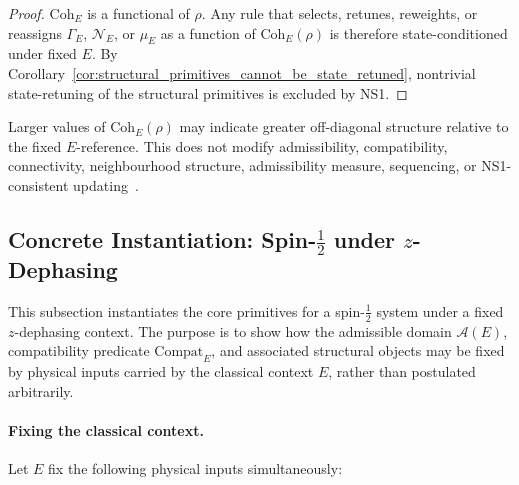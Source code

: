 \documentclass[aps,prx,onecolumn,11pt]{revtex4-2}
\theoremstyle{plain}
\theoremstyle{definition}
\theoremstyle{remark}
\begin{document}
\begin{proof}
\(\mathrm{Coh}_E\) is a functional of \(\rho\). Any rule that selects,
retunes, reweights, or reassigns \(\Gamma_E\), \(\mathcal N_E\), or
\(\mu_E\) as a function of \(\mathrm{Coh}_E(\rho)\) is therefore
state-conditioned under fixed \(E\). By
Corollary~\ref{cor:structural_primitives_cannot_be_state_retuned},
nontrivial state-retuning of the structural primitives is excluded by
NS1.
\end{proof}

Larger values of \(\mathrm{Coh}_E(\rho)\) may indicate greater
off-diagonal structure relative to the fixed \(E\)-reference. This does
not modify admissibility, compatibility, connectivity, neighbourhood
structure, admissibility measure, sequencing, or NS1-consistent
updating~\cite{Baumgratz2014,ChitambarGour2019}.

\subsection{Concrete Instantiation: Spin-\texorpdfstring{$\tfrac{1}{2}$}{1/2} under \(z\)-Dephasing}
\label{sec:zdephasing}

This subsection instantiates the core primitives for a spin-\(\tfrac{1}{2}\)
system under a fixed \(z\)-dephasing context. The purpose is to show how
the admissible domain \(\mathcal A(E)\), compatibility predicate
\(\mathrm{Compat}_E\), and associated structural objects may be fixed by
physical inputs carried by the classical context \(E\), rather than
postulated arbitrarily.

\paragraph{Fixing the classical context.}

Let \(E\) fix the following physical inputs simultaneously:
\end{document}
